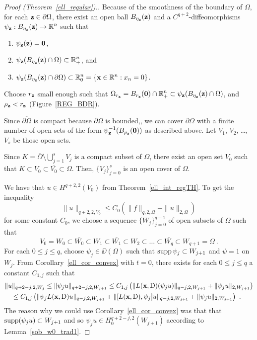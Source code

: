 \begin{proof}[Proof (Theorem~\ref{ell_regular}).]
Because of the smoothness of the boundary of $\Omega$, for
each $\mathbf{z} \in \partial \Omega$, there exist an open ball
$B_{\eta_{\mathbf{z}}}(\mathbf{z})$ and a $\displaystyle C^{q+2}$-diffeomorphisms
$\displaystyle \psi_{\mathbf{z}}:B_{\eta_{\mathbf{z}}}(\mathbf{z}) \rightarrow \mathbb{R}^n$
such that
\begin{enumerate}
\item $\psi_{\mathbf{z}}(\mathbf{z})=\mathbf{0}$,
\item $\displaystyle \psi_{\mathbf{z}}(B_{\eta_{\mathbf{z}}}(\mathbf{z})\cap \Omega)
\subset \mathbb{R}^n_+$, and
\item $\displaystyle \psi_{\mathbf{z}}(B_{\eta_{\mathbf{z}}}(\mathbf{z})\cap
\partial \Omega) \subset \mathbb{R}^n_0=\{\mathbf{x} \in \mathbb{R}^n : x_n=0 \}$.
\end{enumerate}
Choose $r_{\mathbf{z}}$ small enough such that
$\displaystyle \Omega_{r_{\mathbf{z}}} = B_{r_{\mathbf{z}}}(\mathbf{0}) \cap \mathbb{R}^n_+
\subset \psi_{\mathbf{z}}(B_{\eta_{\mathbf{z}}}(\mathbf{z})\cap \Omega)$,
and $\rho_{\mathbf{z}} < r_{\mathbf{z}}$ (Figure~\ref{REG_BDR}).

Since $\overline{\partial \Omega}$ is compact because $\partial \Omega$
is bounded,, we can cover $\partial \Omega$ with a finite
number of open sets of the form
$\displaystyle \psi_{\mathbf{z}}^{-1}(B_{\rho_{\mathbf{z}}}(\mathbf{0}))$
as described above.  Let $V_1$, $V_2$, \ldots, $V_s$ be those open sets.

Since $\displaystyle K = \overline{\Omega} \setminus \bigcup_{j=1}^s V_j$
is a compact subset of $\Omega$, there exist an open set $V_0$ such
that $K \subset V_0 \subset \overline{V_0} \subset \Omega$.
Then, $\displaystyle \{ V_j \}_{j=0}^s$ is an open cover of $\Omega$.

We have that $\displaystyle u \in H^{q+2,2}(V_0)$ from
Theorem~\ref{ell_int_regTH}.  To get the inequality
\[
\|u\|_{q+2,2,V_0} \leq C_0 \left( \|f\|_{q,2,\Omega} + \|u\|_{2,\Omega} \right)
\]
for some constant $C_0$, we choose a sequence
$\displaystyle \{ W_j\}_{j=0}^{q+1}$ of open subsets of $\Omega$ such that
\[
V_0 = W_0 \subset \overline{W_0} \subset W_1 \subset \overline{W_1}
\subset W_2 \subset \ldots \subset \overline{W_q} \subset
W_{q+1} = \Omega \  .
\]
For each $0\leq j \leq q$, choose $\psi_j \in \DD(\Omega)$ such
that $\operatorname{supp} \psi_j \subset W_{j+1}$ and $\psi = 1$ on $W_j$.
From Corollary~\ref{ell_cor_convex} with $t=0$, there exists
for each $0\leq j \leq q$ a constant $C_{1,j}$ such that
\begin{align*}
&\| u \|_{q+2-j,2,W_j} \leq \| \psi_j u \|_{q+2-j,2,W_{j+1}}
\leq C_{1,j} \left( \|L(\mathbf{x},\operatorname{D}) (\psi_j u)\|_{q-j,2,W_{j+1}} +
\|\psi_j u \|_{2,W_{j+1}} \right) \\
&\quad \leq C_{1,j} \left( \| \psi_j L(\mathbf{x},\operatorname{D}) u\|_{q-j,2,W_{j+1}}
+ \| [L(\mathbf{x},\operatorname{D}),\psi_j]  u \|_{q-j,2,W_{j+1}}
 + \|\psi_j u \|_{2,W_{j+1}} \right) \ .
\end{align*}
The reason why we could use Corollary~\ref{ell_cor_convex} was that
that $\operatorname{supp} (\psi_j u) \subset W_{j+1}$ and so 
$\displaystyle \psi_j u \in H^{q+2-j,2}_0(W_{j+1})$ according to
Lemma~\ref{sob_w0_trad1}.


\end{proof}
